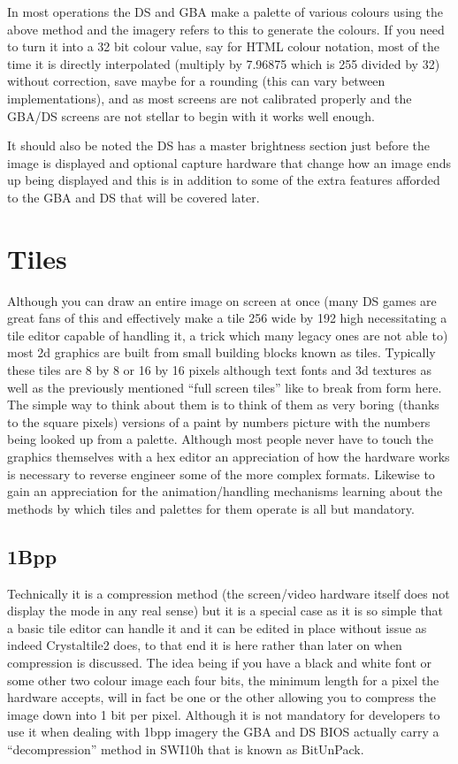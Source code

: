 \documentclass[
]{book}
\begin{document}
In most operations the DS and GBA make a palette of various colours using the above method and the imagery refers to this to generate the colours. If you need to turn it into a 32 bit colour value, say for HTML colour notation, most of the time it is directly interpolated (multiply by 7.96875 which is 255 divided by 32) without correction, save maybe for a rounding (this can vary between implementations), and as most screens are not calibrated properly and the GBA/DS screens are not stellar to begin with it works well enough.

It should also be noted the DS has a master brightness section just before the image is displayed and optional capture hardware that change how an image ends up being displayed and this is in addition to some of the extra features afforded to the GBA and DS that will be covered later.

\hypertarget{tiles}{%
\section{Tiles}\label{tiles}}

Although you can draw an entire image on screen at once (many DS games are great fans of this and effectively make a tile 256 wide by 192 high necessitating a tile editor capable of handling it, a trick which many legacy ones are not able to) most 2d graphics are built from small building blocks known as tiles. Typically these tiles are 8 by 8 or 16 by 16 pixels although text fonts and 3d textures as well as the previously mentioned ``full screen tiles'' like to break from form here. The simple way to think about them is to think of them as very boring (thanks to the square pixels) versions of a paint by numbers picture with the numbers being looked up from a palette. Although most people never have to touch the graphics themselves with a hex editor an appreciation of how the hardware works is necessary to reverse engineer some of the more complex formats. Likewise to gain an appreciation for the animation/handling mechanisms learning about the methods by which tiles and palettes for them operate is all but mandatory.

\hypertarget{bpp}{%
\subsection{1Bpp}\label{bpp}}

Technically it is a compression method (the screen/video hardware itself does not display the mode in any real sense) but it is a special case as it is so simple that a basic tile editor can handle it and it can be edited in place without issue as indeed Crystaltile2 does, to that end it is here rather than later on when compression is discussed. The idea being if you have a black and white font or some other two colour image each four bits, the minimum length for a pixel the hardware accepts, will in fact be one or the other allowing you to compress the image down into 1 bit per pixel. Although it is not mandatory for developers to use it when dealing with 1bpp imagery the GBA and DS BIOS actually carry a ``decompression'' method in SWI10h that is known as BitUnPack.
\end{document}
